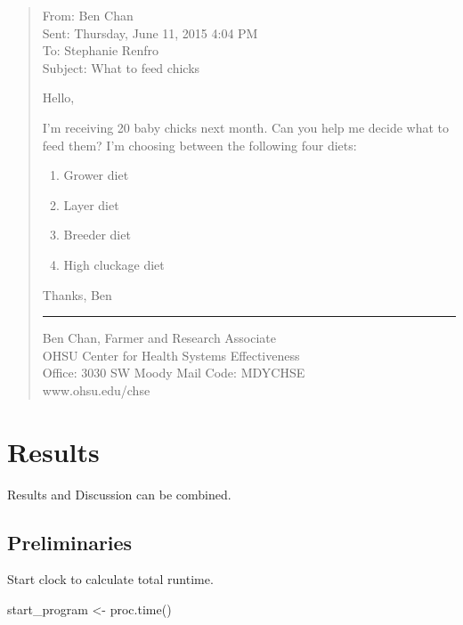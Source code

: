 \documentclass[10pt]{article}
\newenvironment{CodeChunk}{}{}
\begin{document}
\begin{quote}
From: Ben Chan\\Sent: Thursday, June 11, 2015 4:04 PM\\To: Stephanie
Renfro\\Subject: What to feed chicks

Hello,

I'm receiving 20 baby chicks next month. Can you help me decide what to
feed them? I'm choosing between the following four diets:

\begin{enumerate}
\def\labelenumi{\arabic{enumi}.}
\itemsep1pt\parskip0pt
\item
  Grower diet\\
\item
  Layer diet
\item
  Breeder diet
\item
  High cluckage diet
\end{enumerate}

Thanks, Ben

\begin{center}\rule{0.5\linewidth}{\linethickness}\end{center}

Ben Chan, Farmer and Research Associate\\OHSU Center for Health Systems
Effectiveness\\Office: 3030 SW Moody \textbar{} Mail Code:
MDYCHSE\\www.ohsu.edu/chse
\end{quote}

\section*{Results}\label{results}

Results and Discussion can be combined.

\subsection*{Preliminaries}\label{preliminaries}

Start clock to calculate total runtime.

\begin{CodeChunk}
\begin{CodeInput}
start_program <- proc.time()
\end{CodeInput}
\end{CodeChunk}
\end{document}
